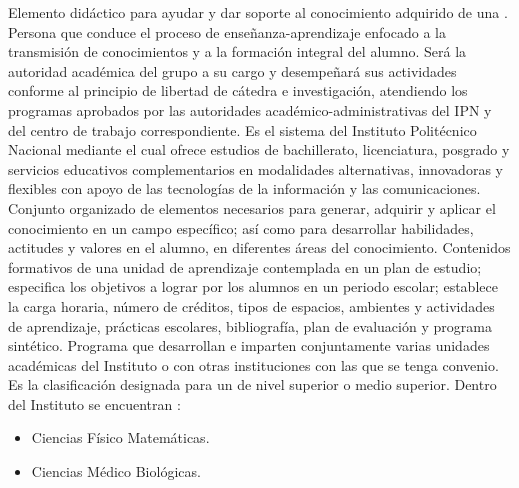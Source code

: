 \begin{bGlosario}
 	 Elemento didáctico para ayudar y dar soporte al conocimiento adquirido de una .
 	 Persona que conduce el proceso de enseñanza-aprendizaje enfocado a la transmisión de conocimientos y a
	la formación integral del alumno. Será la autoridad académica del grupo a su cargo y desempeñará sus actividades conforme al
	principio de libertad de cátedra e investigación, atendiendo los programas aprobados por las autoridades académico-administrativas del
	IPN y del centro de trabajo correspondiente.
 	 Es el sistema del Instituto Politécnico Nacional mediante el cual ofrece estudios
	de bachillerato, licenciatura, posgrado y servicios educativos complementarios en modalidades alternativas, innovadoras y
	flexibles con apoyo de las tecnologías de la información y las comunicaciones.
	 Conjunto organizado de elementos necesarios para generar, adquirir y aplicar
	el conocimiento en un campo específico; así como para desarrollar habilidades, actitudes y valores en el alumno, en diferentes
	áreas del conocimiento. %
 	 Contenidos formativos de una unidad de aprendizaje contemplada en un plan de estudio;
	especifica los objetivos a lograr por los alumnos en un periodo escolar; establece la carga horaria,
	número de créditos, tipos de espacios, ambientes y actividades de aprendizaje, prácticas escolares, bibliografía, plan de evaluación y
	programa sintético.
 	 Programa que desarrollan e imparten conjuntamente varias unidades académicas del Instituto
 	o con otras instituciones con las que se tenga convenio.
 	 Es la clasificación designada para un  de nivel
	superior o medio superior. Dentro del Instituto se encuentran :
	\begin{itemize}
	\item Ciencias Físico Matemáticas.
	\item Ciencias Médico Biológicas.

\end{itemize}
\end{bGlosario}

